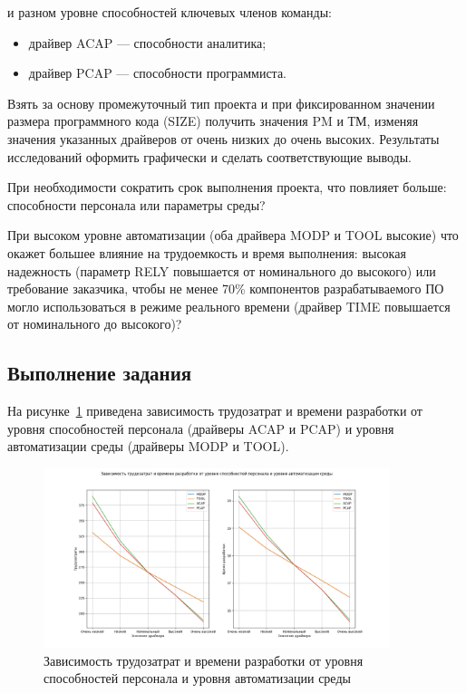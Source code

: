 и разном уровне способностей ключевых членов команды:

\begin{itemize}
	\item драйвер ACAP --- способности аналитика;
	\item драйвер PCAP --- способности программиста.
\end{itemize}

Взять за основу промежуточный тип проекта и при фиксированном значении размера программного кода (SIZE) получить значения PM и ТМ, изменяя значения указанных драйверов от очень низких до очень высоких. Результаты исследований оформить графически и сделать соответствующие выводы. 

При необходимости сократить срок выполнения проекта, что повлияет больше: способности персонала или параметры среды? 

При высоком уровне автоматизации (оба драйвера MODP и TOOL высокие) что окажет большее влияние на трудоемкость и время выполнения:  высокая надежность (параметр RELY повышается 
от номинального до высокого) или требование заказчика, чтобы не менее 70\% компонентов разрабатываемого ПО могло использоваться в режиме реального времени (драйвер TIME повышается от 
номинального до высокого)?

\subsection{Выполнение задания}

На рисунке~\ref{fig:screen2} приведена зависимость трудозатрат и времени разработки от уровня способностей персонала (драйверы ACAP и PCAP) и уровня автоматизации среды (драйверы MODP и TOOL).

\begin{figure}[H]
	\centering
	\includegraphics[width=0.9\textwidth]{img/task1_1.png}
	\caption{Зависимость трудозатрат и времени разработки от уровня способностей персонала и уровня автоматизации среды}
	\label{fig:screen2}
\end{figure}


